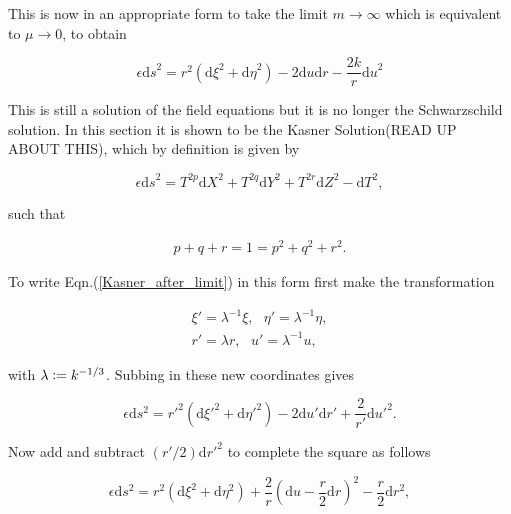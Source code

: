 This is now in an appropriate form to take the limit $m \rightarrow \infty$ which is equivalent to $\mu \rightarrow 0$, to obtain

\begin{equation}\label{Kasner_after_limit}
\epsilon {\mathrm{d}s}^2 = r^2 ({\mathrm{d}\xi}^2 + {\mathrm{d}\eta}^2) - 2 {\mathrm{d}u}{\mathrm{d}r} - \frac{2k}{r} {\mathrm{d}u}^2
\end{equation}

\noindent This is still a solution of the field equations but it is no longer the Schwarzschild solution. In this section it is shown to be the Kasner Solution(READ UP ABOUT THIS), which by definition is given by

\begin{equation}\label{Reparameterise_Definition_Of_Kasner} 
\epsilon {\mathrm{d}s}^2 = T^{2p} {\mathrm{d}X}^2 + T^{2q} \mathrm{d}Y^2 + T^{2r} \mathrm{d}Z^2 - \mathrm{d}T^2,
\end{equation}

\noindent such that

\begin{eqnarray*}
p + q + r = 1 = p^2 + q^2 + r^2.
\end{eqnarray*}

To write Eqn.(\ref{Kasner_after_limit}) in this form first make the transformation

\begin{gather*} 
\xi' = \lambda^{-1} \xi, \text{    }  \eta' = \lambda^{-1} \eta, \\
r' = \lambda r,          \text{    }  u' = \lambda^{-1} u,
\end{gather*}

\noindent with $\lambda \vcentcolon = k^{-1/3}$. Subbing in these new coordinates gives

\begin{equation*}  
\epsilon \mathrm{d} s^2 = {r'}^2 (\mathrm{d} {\xi'}^2 + \mathrm{d} {\eta'}^2) - 2 \mathrm{d} u' \mathrm{d} r' + \frac{2}{r'}\mathrm{d} {u'}^2.
\end{equation*}

\noindent Now add and subtract $(r'/2) \mathrm{d} {r'}^2$ to complete the square as follows

\begin{equation*}  
\epsilon \mathrm{d} s^2 = r^2 (\mathrm{d} \xi^2 + \mathrm{d} \eta^2) + \frac{2}{r}{\left( \mathrm{d} u  - \frac{r}{2} \mathrm{d} r\right)}^2 - \frac{r}{2}\mathrm{d} r^2,
\end{equation*}

